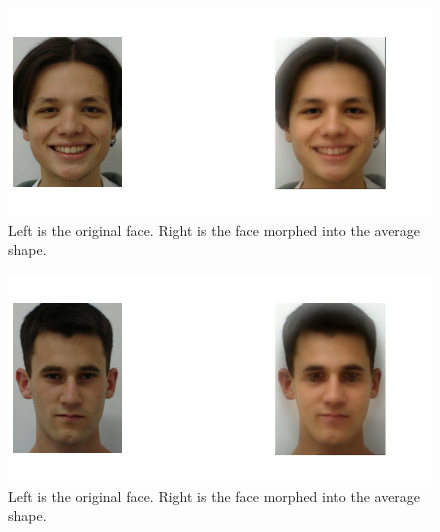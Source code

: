 \documentclass{article}
\begin{document}
\begin{figure}[!htb]
    \centering
    \includegraphics[scale=0.5]{im5.png}
    \caption{Left is the original face. Right is the face morphed into the average shape.}
\end{figure}

\begin{figure}[!htb]
    \centering
    \includegraphics[scale=0.5]{im6.png}
    \caption{Left is the original face. Right is the face morphed into the average shape.}
\end{figure}
\newpage
\end{document}
